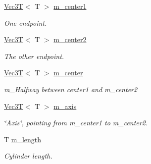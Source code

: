 \begin{DoxyCompactItemize}
\item 
\mbox{\label{classCylinderSDF_ac69f666234c9625306153be47295cdbc}} 
\hyperlink{classVec3T}{Vec3T}$<$ T $>$ \hyperlink{classCylinderSDF_ac69f666234c9625306153be47295cdbc}{m\+\_\+center1}
\begin{DoxyCompactList}\small\item\em One endpoint. \end{DoxyCompactList}\item 
\mbox{\label{classCylinderSDF_a02b8aea5350ad933ed53abea6cb58103}} 
\hyperlink{classVec3T}{Vec3T}$<$ T $>$ \hyperlink{classCylinderSDF_a02b8aea5350ad933ed53abea6cb58103}{m\+\_\+center2}
\begin{DoxyCompactList}\small\item\em The other endpoint. \end{DoxyCompactList}\item 
\mbox{\label{classCylinderSDF_a38e901843de5889a3c3eee35bc2a534c}} 
\hyperlink{classVec3T}{Vec3T}$<$ T $>$ \hyperlink{classCylinderSDF_a38e901843de5889a3c3eee35bc2a534c}{m\+\_\+center}
\begin{DoxyCompactList}\small\item\em m\+\_\+\+Halfway between center1 and m\+\_\+center2 \end{DoxyCompactList}\item 
\mbox{\label{classCylinderSDF_a034a7baec832c8a19fd2cd33ec1358eb}} 
\hyperlink{classVec3T}{Vec3T}$<$ T $>$ \hyperlink{classCylinderSDF_a034a7baec832c8a19fd2cd33ec1358eb}{m\+\_\+axis}
\begin{DoxyCompactList}\small\item\em \char`\"{}\+Axis\char`\"{}, pointing from m\+\_\+center1 to m\+\_\+center2. \end{DoxyCompactList}\item 
\mbox{\label{classCylinderSDF_a715c9888a921083d827bad94b4660626}} 
T \hyperlink{classCylinderSDF_a715c9888a921083d827bad94b4660626}{m\+\_\+length}
\begin{DoxyCompactList}\small\item\em Cylinder length. \end{DoxyCompactList}\item 

\end{DoxyCompactItemize}
